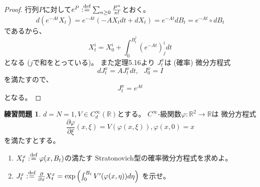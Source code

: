 \documentclass[uplatex]{jsarticle}
\theoremstyle{definition}
\newtheorem{prob}[prob]{練習問題}
\def\R{\mathbb{R}}
\def\dfn{:\overset{\mbox{{\scriptsize def}}}{=}}
\begin{document}
\begin{proof}
  行列\(P\)に対して\(e^P \dfn \sum_{n\geq 0}\frac{P^n}{n!}\)とおく。
  \[
  d\left( e^{-At}X_t \right)
  = e^{-At}\left( -AX_tdt + dX_t \right)
  = e^{-At} dB_t
  = e^{-At}\circ dB_t
  \]
  であるから、
  \[
  X_t^i = X_0^i + \int_0^{B_t^j}\left(e^{-At}\right)^i_j dt
  \]
  となる (\(j\)で和をとっている)。
  また定理5.16より
  \(J_t^x\)は (確率) 微分方程式
  \[
  dJ_t^x = AJ_t^xdt , \ \ \ J_0^x = I
  \]
  を満たすので、
  \[
  J_t^x = e^{At}
  \]
  となる。
\end{proof}













\begin{prob}\label{prob: 5.4}
  \(d=N=1, V\in C^\infty_d(\R)\)とする。
  \(C^\infty\)-級関数\(\varphi:\R^2 \to \R\)は
  微分方程式
  \[
  \frac{\partial \varphi}{\partial \xi}(x,\xi) = V(\varphi(x,\xi)) ,
  \varphi(x,0)=x
  \]
  を満たすとする。
  \begin{enumerate}
    \item \label{enumi: prob: 5.4-1}
    \(X_t^x \dfn \varphi(x,B_t)\)の満たす
    Stratonovich型の確率微分方程式を求めよ。
    \item \label{enumi: prob: 5.4-2}
    \(J_t^x \dfn \frac{\partial}{\partial x}X_t^x =
    \exp\left( \int_0^{B_t}V'(\varphi(x,\eta))d\eta \right)\)
    を示せ。
  \end{enumerate}
\end{prob}
\end{document}
